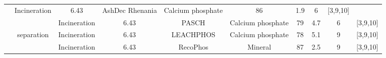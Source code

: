 \documentclass[authoryear]{elsarticle}
\begin{document}
\begin{table}
{\begin{threeparttable}
\begin{tabular}{@{}cccccccccc@{}}
				& Incineration                                                                     & 6.43                                      & AshDec Rhenania                                                                          & Calcium phosphate                                                                 & 86                                                                                    & 1.9                                  & 6                                                            &    [3,9,10]      \\
				&                                                                                                                                                         & Incineration                                                                     & 6.43                                      & PASCH                                                                                    & Calcium phosphate                                                                 & 79                                                                                    & 4.7                                  & 6                                                            &     [3,9,10]     \\
				&                                                                                                                                separation                         & Incineration                                                                     & 6.43                                      & LEACHPHOS                                                                                & Calcium phosphate                                                                 & 78                                                                                    & 5.1                                  & 9                                                            &      [3,9,10]    \\
				&                                                                                                                                                         & Incineration                                                                     & 6.43                                      & RecoPhos                                                                                 & Mineral                                                                           & 87                                                                                    & 2.5                                  & 9                                                            &     [3,9,10]     \\

\end{tabular}
\end{threeparttable}}
\end{table}
\end{document}
